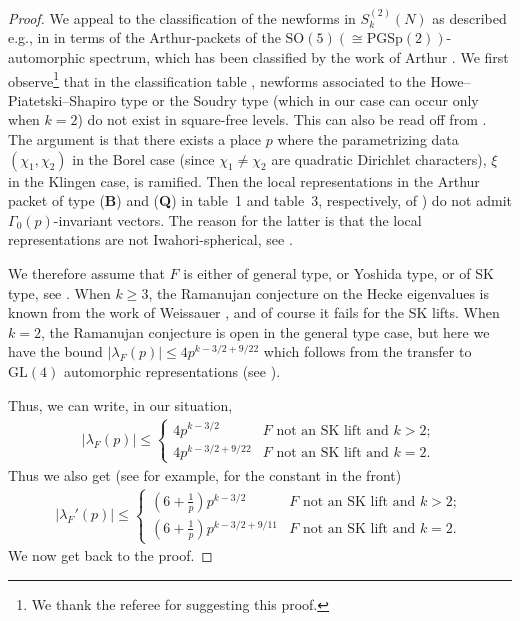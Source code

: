 \documentclass[11pt]{amsart}
\numberwithin{equation}{section}
\theoremstyle{plain}
\theoremstyle{definition}
\newcommand{\mrm}{\mathrm}
\begin{document}
\begin{proof}
We appeal to the classification \cite{arthur} of the newforms in $S_k^{(2)}(N)$ as described e.g., in \cite[Prop.~2.3.1]{saha-paul}
in terms of the Arthur-packets of the $\mrm{SO}(5) (\cong \mrm{PGSp}(2))$-automorphic spectrum, which has been classified by the work of Arthur \cite{arthur}. We first observe\footnote{We thank the referee for suggesting this proof.} that in the classification table \cite[Table~3]{schmidt-para}, newforms associated to the Howe–Piatetski–Shapiro type or the Soudry type (which in our case can occur only when $k=2$) do not exist in square-free levels. This can also be read off from \cite[Prop.~2.1, Section~2.3]{roy-schmidt-yi}. The argument is that there
exists a place $p$ where the parametrizing data $(\chi_1,\chi_2)$ in the Borel case (since $\chi_1 \neq \chi_2$ are quadratic Dirichlet characters), $\xi$ in the Klingen case, is
ramified. Then the local representations in the Arthur packet of type ({\bf B}) and ({\bf Q}) in table~1 and table~3, respectively, of \cite{schmidt-para}) do not admit $\Gamma_0(p)$-invariant vectors. The reason for the latter is that the local representations are not Iwahori-spherical, see \cite[Prop.~2.1]{roy-schmidt-yi}.

We therefore assume that $F$ is either of general type, or Yoshida type, or of SK type, see \cite{saha-paul}. 
When $k \ge 3$, the Ramanujan conjecture on the Hecke eigenvalues is known from the work of Weissauer \cite{weissauer}, and of course it fails for the SK lifts. When $k=2$, the Ramanujan conjecture is open in the general type case, but here we have the bound $|\lambda_F(p)|\le 4 p^{k-3/2+9/22}$ which follows from the transfer to $\mrm{GL}(4)$ automorphic representations (see \cite{kim2003functoriality}).

Thus, we can write, in our situation,
\begin{align}\label{lambdap-bound}
 |\lambda_F(p)|\le \begin{cases}
   4 p^{k-3/2}  & F \text{ not an SK lift and }  k >2;\\
   4 p^{k-3/2+9/22} & F \text{ not an SK lift and }  k =2.
\end{cases}
\end{align}
Thus we also get (see for example, \cite[Eq. 2.11]{anamby2021large} for the constant in the front)
\begin{align}\label{lambda'p-bound}
 |\lambda_F'(p)|\le \begin{cases}
   (6+\frac{1}{p}) p^{k-3/2}  & F \text{ not an SK lift and }  k >2;\\
   (6+\frac{1}{p}) p^{k-3/2+9/11} & F \text{ not an SK lift and }  k =2.
\end{cases}
\end{align}
We now get back to the proof.


\end{proof}
\end{document}
